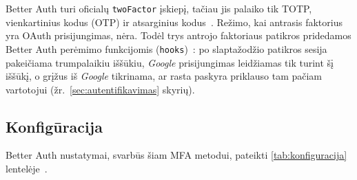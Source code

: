 Better Auth turi oficialų \texttt{twoFactor} įskiepį, tačiau jis palaiko tik TOTP, vienkartinius kodus (OTP) ir atsarginius kodus~\cite{better_auth_2fa}. Režimo, kai antrasis faktorius yra OAuth prisijungimas, nėra. Todėl trys antrojo faktoriaus patikros pridedamos Better Auth perėmimo funkcijomis (\texttt{hooks})~\cite{better_auth_hooks}: po slaptažodžio patikros sesija pakeičiama trumpalaikiu iššūkiu, \textit{Google} prisijungimas leidžiamas tik turint šį iššūkį, o grįžus iš \textit{Google} tikrinama, ar rasta paskyra priklauso tam pačiam vartotojui (žr.~\ref{sec:autentifikavimas} skyrių).

\subsection{Konfigūracija}
\label{subsec:konfiguracija}

Better Auth nustatymai, svarbūs šiam MFA metodui, pateikti \ref{tab:konfiguracija} lentelėje~\cite{better_auth_options,better_auth_google,better_auth_accounts}.


